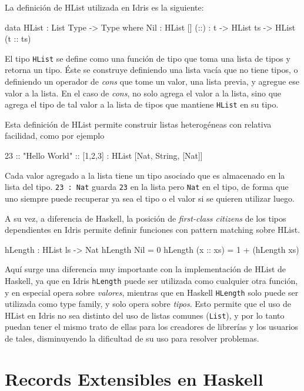 La definición de HList utilizada en Idris es la siguiente:

\begin{code}
data HList : List Type -> Type where
  Nil : HList []
  (::) : t -> HList ts -> HList (t :: ts)
\end{code}

El tipo \texttt{HList} se define como una función de tipo que toma una lista de tipos y retorna un tipo. Éste se construye definiendo una lista vacía que no tiene tipos, o definiendo un operador de \textit{cons} que tome un valor, una lista previa, y agregue ese valor a la lista. En el caso de \textit{cons}, no solo agrega el valor a la lista, sino que agrega el tipo de tal valor a la lista de tipos que mantiene \texttt{HList} en su tipo.

Esta definición de HList permite construir listas heterogéneas con relativa facilidad, como por ejemplo 

\begin{code}
23 :: "Hello World" :: [1,2,3] :
    HList [Nat, String, [Nat]]
\end{code}

Cada valor agregado a la lista tiene un tipo asociado que es almacenado en la lista del tipo. \texttt{23 : Nat} guarda \texttt{23} en la lista pero \texttt{Nat} en el tipo, de forma que uno siempre puede recuperar ya sea el tipo o el valor si se quieren utilizar luego.

A su vez, a diferencia de Haskell, la posición de \textit{first-class citizens} de los tipos dependientes en Idris permite definir funciones con pattern matching sobre HList.

\begin{code}
hLength : HList ls -> Nat
hLength Nil = 0
hLength (x :: xs) = 1 + (hLength xs)
\end{code}

Aquí surge una diferencia muy importante con la implementación de HList de Haskell, ya que en Idris \texttt{hLength} puede ser utilizada como cualquier otra función, y en especial opera sobre \textit{valores}, mientras que en Haskell \texttt{HLength} solo puede ser utilizada como type family, y solo opera sobre \textit{tipos}.
Esto permite que el uso de HList en Idris no sea distinto del uso de listas comunes (\texttt{List}), y por lo tanto puedan tener el mismo trato de ellas para los creadores de librerías y los usuarios de tales, disminuyendo la dificultad de su uso para resolver problemas.

\section{Records Extensibles en Haskell}

